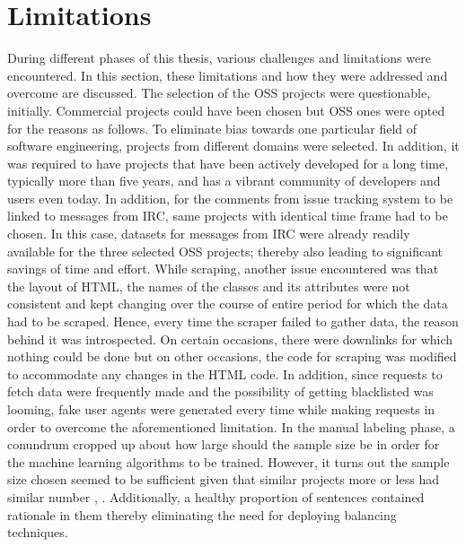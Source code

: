 \documentclass[a4paper,12pt,twoside]{report}
\begin{document}
\section{Limitations}
During different phases of this thesis, various challenges and limitations were encountered. In this section, these limitations and how they were addressed and overcome are discussed. 
\newline \newline
The selection of the \acs{OSS} projects were questionable, initially. Commercial projects could have been chosen but \acs{OSS} ones were opted for the reasons as follows. To eliminate bias towards one particular field of software engineering, projects from different domains were selected. In addition, it was required to have projects that have been actively developed for a long time, typically more than five years, and has a vibrant community of developers and users even today. In addition, for the comments from issue tracking system to be linked to messages from \acs{IRC}, same projects with identical time frame had to be chosen. In this case, datasets for messages from \acs{IRC} were already readily available for the three selected \acs{OSS} projects; thereby also leading to significant savings of time and effort. 
\newline \newline
While scraping, another issue encountered was that the layout of \acs{HTML}, the names of the classes and its attributes were not consistent and kept changing over the course of entire period for which the data had to be scraped. Hence, every time the scraper failed to gather data, the reason behind it was introspected. On certain occasions, there were downlinks for which nothing could be done but on other occasions, the code for scraping was modified to accommodate any changes in the \acs{HTML} code. In addition, since requests to fetch data were frequently made and the possibility of getting blacklisted was looming, fake user agents were generated every time while making requests in order to overcome the aforementioned limitation. 
\newline \newline
In the manual labeling phase, a conundrum cropped up about how large should the sample size be in order for the machine learning algorithms to be trained. However, it turns out the sample size chosen seemed to be sufficient given that similar projects more or less had similar number \cite{Alkadhi2017}, \cite{Nonnenmacher2017}. Additionally, a healthy proportion of sentences contained rationale in them thereby eliminating the need for deploying balancing techniques.  
\end{document}
